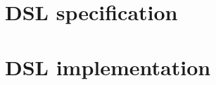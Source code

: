 \documentclass[report.tex]{subfiles}
\begin{document}

\section{DSL specification} \label{ref:volr}


\section{DSL implementation} \label{ref:implementation}

\end{document}
